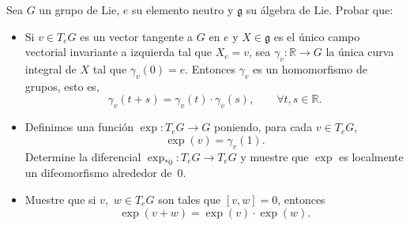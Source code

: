 \documentclass[11pt]{article}
\newcommand{\R}{\mathbb{R}}
\newcommand{\paint}[1]{\color{color}{#1}}
\newenvironment{exercise}[2][Ejercicio]{\begin{trivlist}
\item[\hskip \labelsep \paint{{\bfseries #1}}\hskip \labelsep {\bfseries #2.}]}{\end{trivlist}}
\begin{document}
\begin{exercise}{9} Sea $G$ un grupo de Lie, $e$ su elemento neutro y $\mathfrak{g}$ su \'algebra de Lie. Probar que:
\begin{itemize}
\item[a)] Si $v\in T_eG$ es un vector tangente a $G$ en $e$ y $X\in\mathfrak{g}$ es el \'unico campo vectorial invariante a izquierda tal que $X_e=v$, sea $\gamma_v:\R\to G$ la \'unica curva integral de $X$ tal que $\gamma_v(0)=e$. Entonces $\gamma_v$ es un homomorfismo de grupos, esto es,
  \[
  \gamma_v(t+s)=\gamma_v(t)\cdot\gamma_v(s), \qquad\forall t,s\in\R.
  \]

\item[b)] Definimos una funci\'on $\exp:T_eG\to G$ poniendo, para cada $v\in
T_eG$, 
  \[
  \exp(v)=\gamma_v(1).
  \]
Determine la diferencial $\exp_{*0}:T_eG\to T_eG$ y muestre que $\exp$ es
localmente un difeomorfismo alrededor de~$0$.

\item[c)] Muestre que si $v$,~$w\in T_eG$ son tales que $[v,w]=0$, entonces
  \[
  \exp(v+w)=\exp(v)\cdot\exp(w).
  \]
\end{itemize}
\end{exercise}
\end{document}
